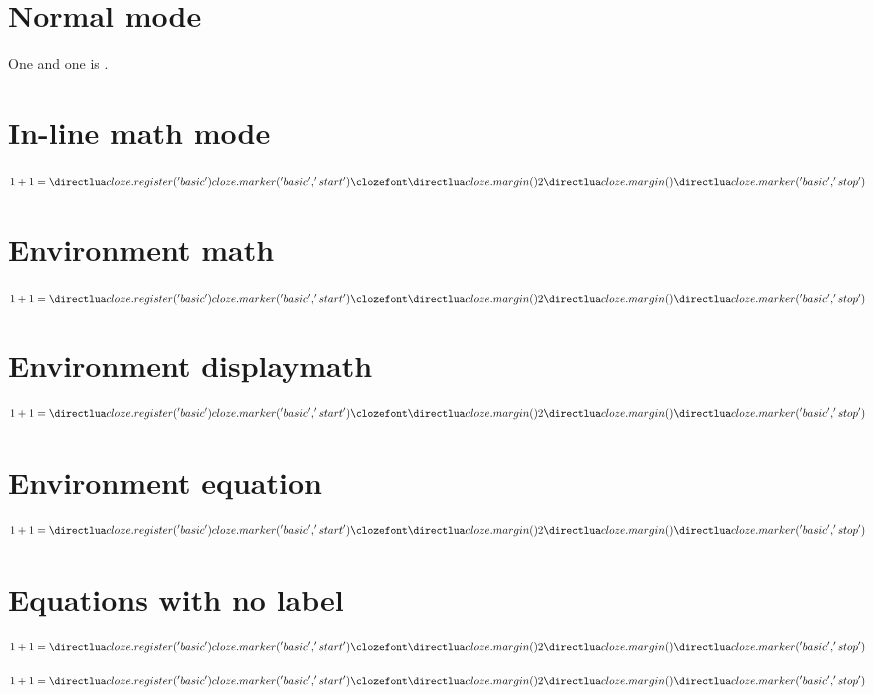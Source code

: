 \documentclass{article}
\begin{document}
\TestTitleDesc{}
{}

\section{Normal mode}

One and one is .

\section{In-line math mode}

$1+1=\cloze{2}$

\section{Environment math}

\begin{math}
1+1=\cloze{2}
\end{math}

\section{Environment displaymath}

\begin{displaymath}
1+1=\cloze{2}
\end{displaymath}

\section{Environment equation}

\begin{equation}
1+1=\cloze{2}
\end{equation}

\section{Equations with no label}

\clozehide

\[1+1=\cloze{2}\]

\[1+1=\cloze{2}\]
\end{document}
